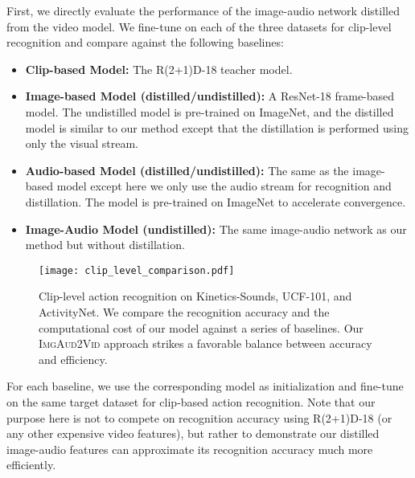 First, we directly evaluate the performance of the image-audio network distilled from the video model. We fine-tune on each of the three datasets for clip-level recognition and compare against the following baselines:

\vspace{-0.1in}
\begin{itemize}[leftmargin=4mm]
\itemsep0em
\item \textbf{Clip-based Model:} The R(2+1)D-18 teacher model.
\vspace{-0.05in}
\item \textbf{Image-based Model (distilled/undistilled):} A ResNet-18 frame-based model. The undistilled model is pre-trained on ImageNet, and the distilled model is similar to our method except that the distillation is performed using only the visual stream. 
\vspace{-0.05in}
\item \textbf{Audio-based Model (distilled/undistilled):} The same as the image-based model except here we only use the audio stream for recognition and distillation. The model is pre-trained on ImageNet to accelerate convergence.
\vspace{-0.05in}
\item \textbf{Image-Audio Model (undistilled):} The same image-audio network as our method but without distillation.
\end{itemize}
\vspace{-0.1in}

\begin{figure}
    \center
    \texttt{[image: clip\_level\_comparison.pdf]}
    \caption{Clip-level action recognition on Kinetics-Sounds, UCF-101, and ActivityNet. We compare the recognition accuracy and the computational cost of our model against a series of baselines. Our \textsc{ImgAud2Vid} approach strikes a favorable balance between accuracy and efficiency.
    \vspace{-0.1in}} 
    \label{fig:clip_level_comparison}
    \vspace{-0.1in}
\end{figure}

For each baseline, we use the corresponding model as initialization and fine-tune on the same target dataset for clip-based action recognition. Note that our purpose here is not to compete on recognition accuracy using R(2+1)D-18 (or any other expensive video features), but rather to demonstrate our distilled image-audio features can approximate its recognition accuracy much more efficiently.

